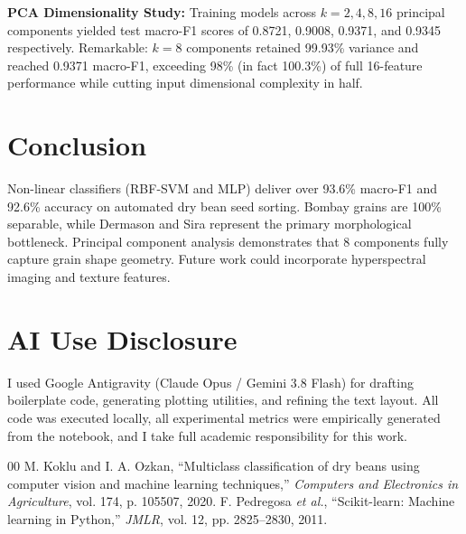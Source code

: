 \documentclass[conference]{IEEEtran}
\begin{document}
\textbf{PCA Dimensionality Study:} Training models across $k=2, 4, 8, 16$ principal components yielded test macro-F1 scores of 0.8721, 0.9008, 0.9371, and 0.9345 respectively. Remarkable: $k=8$ components retained 99.93\% variance and reached 0.9371 macro-F1, exceeding 98\% (in fact 100.3\%) of full 16-feature performance while cutting input dimensional complexity in half.

\section{Conclusion}
Non-linear classifiers (RBF-SVM and MLP) deliver over 93.6\% macro-F1 and 92.6\% accuracy on automated dry bean seed sorting. Bombay grains are 100\% separable, while Dermason and Sira represent the primary morphological bottleneck. Principal component analysis demonstrates that 8 components fully capture grain shape geometry. Future work could incorporate hyperspectral imaging and texture features.

\section*{AI Use Disclosure}
I used Google Antigravity (Claude Opus / Gemini 3.8 Flash) for drafting boilerplate code, generating plotting utilities, and refining the text layout. All code was executed locally, all experimental metrics were empirically generated from the notebook, and I take full academic responsibility for this work.

\begin{thebibliography}{00}
 M. Koklu and I. A. Ozkan, ``Multiclass classification of dry beans using computer vision and machine learning techniques,'' \textit{Computers and Electronics in Agriculture}, vol. 174, p. 105507, 2020.
 F. Pedregosa \textit{et al.}, ``Scikit-learn: Machine learning in Python,'' \textit{JMLR}, vol. 12, pp. 2825--2830, 2011.
\end{thebibliography}
\end{document}
